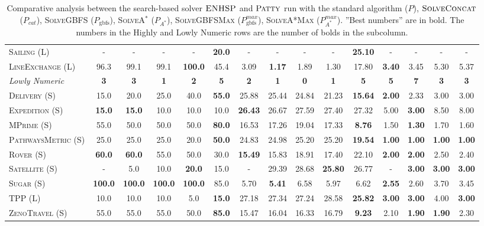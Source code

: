 \documentclass[11pt,landscape]{article}
\begin{document}
\begin{table*}[tb]
{\begin{tabular}{|l||ccccc||ccccc||cccc||}
\textsc{Sailing} (L)&-&-&-&-&\textbf{20.0}&-&-&-&-&\textbf{25.10}&-&-&-&-\\
\textsc{LineExchange} (L)&96.3&99.1&99.1&\textbf{100.0}&45.4&3.09&\textbf{1.17}&1.89&1.30&17.80&\textbf{3.40}&3.45&5.30&5.37
\\\hline
\textit{Lowly Numeric}&\textbf{3}&\textbf{3}&\textbf{1}&\textbf{2}&\textbf{5}&\textbf{2}&\textbf{1}&\textbf{0}&\textbf{1}&\textbf{5}&\textbf{5}&\textbf{7}&\textbf{3}&\textbf{3}\\\hline
\textsc{Delivery} (S)&15.0&20.0&25.0&40.0&\textbf{55.0}&25.88&25.44&24.84&21.23&\textbf{15.64}&\textbf{2.00}&2.33&3.00&3.00\\
\textsc{Expedition} (S)&\textbf{15.0}&\textbf{15.0}&10.0&10.0&10.0&\textbf{26.43}&26.67&27.59&27.40&27.32&5.00&\textbf{3.00}&8.50&8.00\\
\textsc{MPrime} (S)&55.0&50.0&50.0&50.0&\textbf{80.0}&16.53&17.26&19.04&17.33&\textbf{8.76}&1.50&\textbf{1.30}&1.70&1.60\\
\textsc{PathwaysMetric} (S)&25.0&25.0&25.0&20.0&\textbf{50.0}&24.83&24.98&25.20&25.20&\textbf{19.54}&\textbf{1.00}&\textbf{1.00}&\textbf{1.00}&\textbf{1.00}\\
\textsc{Rover} (S)&\textbf{60.0}&\textbf{60.0}&55.0&50.0&30.0&\textbf{15.49}&15.83&18.91&17.40&22.10&\textbf{2.00}&\textbf{2.00}&2.50&2.40\\
\textsc{Satellite} (S)&-&5.0&10.0&\textbf{20.0}&15.0&-&29.39&28.68&\textbf{25.80}&26.77&-&\textbf{3.00}&\textbf{3.00}&\textbf{3.00}\\
\textsc{Sugar} (S)&\textbf{100.0}&\textbf{100.0}&\textbf{100.0}&\textbf{100.0}&85.0&5.70&\textbf{5.41}&6.58&5.97&6.62&\textbf{2.55}&2.60&3.70&3.45\\
\textsc{TPP} (L)&10.0&10.0&10.0&5.0&\textbf{15.0}&27.18&27.34&27.24&28.58&\textbf{25.82}&\textbf{3.00}&\textbf{3.00}&4.00&\textbf{3.00}\\
\textsc{ZenoTravel} (S)&55.0&55.0&55.0&50.0&\textbf{85.0}&15.47&16.04&16.33&16.79&\textbf{9.23}&2.10&\textbf{1.90}&\textbf{1.90}&2.30
\\\hline

        \end{tabular}}
        \caption{Comparative analysis between the search-based solver $\textsc{ENHSP}$ and  $\textsc{Patty}$ run with the standard algorithm ($P$),  $\textsc{SolveConcat}$ ($P_{cat}$), \textsc{SolveGBFS} ($P_\text{gbfs}$), \textsc{SolveA}$^*$ ($P_{A^*}$), \textsc{SolveGBFSMax} ($P_\text{gbfs}^{max}$), \textsc{SolveA*Max} ($P_{A^*}^{max}$). ''Best numbers'' are in bold.  The numbers in the Highly and Lowly Numeric rows are the number of bolds in the subcolumn.}
        \label{tab:experiments}
        \end{table*}
        
\end{document}
